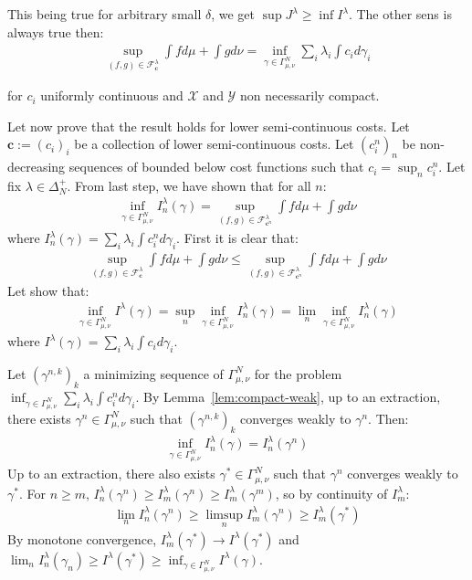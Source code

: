\begin{prv*}
This being true for arbitrary small $\delta$, we get $\sup J^\lambda\geq\inf I^\lambda$. The other sens is always true then:
\begin{align*}
\sup\limits_{(f,g)\in\mathcal{F}^\lambda_\mathbf{c}}\int fd\mu+\int gd\nu = \inf\limits_{\gamma\in\Gamma^N_{\mu,\nu}}\sum_i\lambda_i \int c_id\gamma_i
\end{align*}

for $c_i$ uniformly continuous and $\mathcal{X}$ and $\mathcal{Y}$ non necessarily compact.

\medskip
Let now prove that the result holds for lower semi-continuous costs. Let $\mathbf{c}:=(c_i)_i$ be a collection of lower semi-continuous costs. Let $(c^n_i)_n$ be non-decreasing sequences of bounded below cost functions such that $c_i=\sup_n c^n_i$. Let fix $\lambda\in\Delta^+_N$. From last step, we have shown that for all $n$:
\begin{align}
    \label{eq:eq_on_cont}
    \inf_{\gamma\in \Gamma^N_{\mu,\nu}} I^\lambda_n(\gamma)= \sup\limits_{(f,g)\in\mathcal{F}^\lambda_{\mathbf{c}^n}}\int fd\mu+\int gd\nu
\end{align}
where $I^\lambda_n(\gamma)=\sum_i\lambda_i \int c^n_id\gamma_i$. First it is clear that:
\begin{align}
\label{eq:ineq_sup}
\sup\limits_{(f,g)\in\mathcal{F}^\lambda_\mathbf{c}}\int fd\mu+\int gd\nu\leq \sup\limits_{(f,g)\in\mathcal{F}^{\lambda}_{\mathbf{c}^n}}\int fd\mu+\int gd\nu
\end{align}
Let show that:
\begin{align*}
\inf_{\gamma\in \Gamma^N_{\mu,\nu}} I^\lambda(\gamma)=\sup_n\inf_{\gamma\in \Gamma^N_{\mu,\nu}} I^\lambda_n(\gamma) = \lim_n\inf_{\gamma\in \Gamma^N_{\mu,\nu}} I^\lambda_n(\gamma)
\end{align*}
where $I^\lambda(\gamma) = \sum_i\lambda_i \int c_id\gamma_i$. 

Let $(\gamma^{n,k})_k$ a minimizing sequence of $\Gamma^N_{\mu,\nu}$ for the problem $\inf_{\gamma\in \Gamma^N_{\mu,\nu}} \sum_i\lambda_i \int c^n_id\gamma_i$. By Lemma~\ref{lem:compact-weak}, up to an extraction, there exists  $\gamma^n\in \Gamma^N_{\mu,\nu}$ such that $(\gamma^{n,k})_k$ converges weakly to $\gamma^n$. Then:
\begin{align*}
\inf_{\gamma\in \Gamma^N_{\mu,\nu}} I_n^\lambda(\gamma) =I^\lambda_n(\gamma^n)
\end{align*}
Up to an extraction, there also exists $\gamma^*\in\Gamma^N_{\mu,\nu}$ such that $\gamma^n$ converges weakly to $\gamma^*$. For $n\geq m$, $I^\lambda_n(\gamma^n) \geq I^\lambda_m(\gamma^n)\geq I^\lambda_m(\gamma^m) $, so by continuity of $I^\lambda_m$:
\begin{align*}
\lim_n I^\lambda_n(\gamma^n) \geq\limsup_n I^\lambda_m(\gamma^n)\geq I^\lambda_m(\gamma^*)
\end{align*}
By monotone convergence, $I^\lambda_m(\gamma^*)\rightarrow I^\lambda(\gamma^*)$ and $\lim_nI^\lambda_n(\gamma_n) \geq I^\lambda(\gamma^*)\geq\inf_{\gamma\in\Gamma^N_{\mu,\nu}}I^\lambda(\gamma)$.


\end{prv*}
